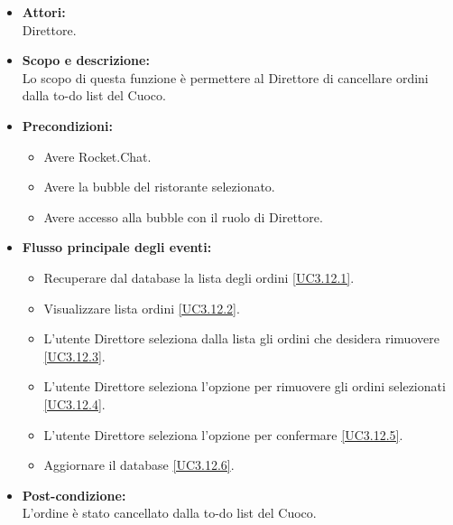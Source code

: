 
\begin{itemize}
	\item \textbf{Attori:}
	\\Direttore.
	\item \textbf{Scopo e descrizione:} 
	\\Lo scopo di questa funzione è permettere al Direttore di cancellare ordini dalla to-do list del Cuoco.
	\item \textbf{Precondizioni:}
	\begin{itemize}
		\item Avere Rocket.Chat.
		\item Avere la bubble del ristorante selezionato.
		\item Avere accesso alla bubble con il ruolo di Direttore.
	\end{itemize}
	\item \textbf{Flusso principale degli eventi:}
	\begin{itemize}
		\item Recuperare dal database la lista degli ordini \ref{UC3.12.1}.
		\item Visualizzare lista ordini \ref{UC3.12.2}.
		\item L'utente Direttore seleziona dalla lista gli ordini che desidera rimuovere \ref{UC3.12.3}.
		\item L'utente Direttore seleziona l'opzione per rimuovere gli ordini selezionati \ref{UC3.12.4}.
		\item L'utente Direttore seleziona l'opzione per confermare \ref{UC3.12.5}.
		\item Aggiornare il database \ref{UC3.12.6}.
	\end{itemize}
	\item \textbf{Post-condizione:}
	\\L'ordine è stato cancellato dalla to-do list del Cuoco.
\end{itemize}


